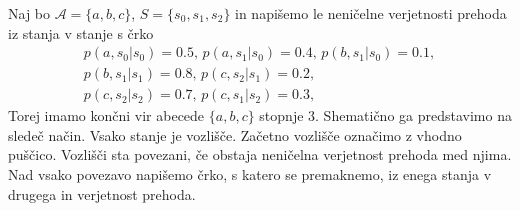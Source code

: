 \documentclass[fin1, tisk]{fmfdelo}
\newcommand{\A}{\mathcal{A}}
\theoremstyle{definition}
\begin{document}
\begin{primer}
    Naj bo $\A = \{ a, b, c \}$, $S = \{ s_0, s_1, s_2 \}$ in napišemo le neničelne 
    verjetnosti prehoda iz stanja v stanje s črko
    \begin{gather*}
        p(a, s_0|s_0) = 0.5, \, p(a, s_1|s_0) = 0.4, \, p(b, s_1|s_0) = 0.1, \\
        p(b, s_1|s_1) = 0.8, \, p(c, s_2|s_1) = 0.2, \\
        p(c, s_2|s_2) = 0.7, \, p(c, s_1|s_2) = 0.3,
    \end{gather*}
    Torej imamo končni vir abecede $\{ a, b, c \}$ stopnje $3$. Shematično ga predstavimo na 
    sledeč način. Vsako stanje je vozlišče. Začetno vozlišče označimo z vhodno puščico. Vozlišči sta 
    povezani, če obstaja neničelna verjetnost prehoda med njima. Nad vsako povezavo napišemo črko,
    s katero se premaknemo, iz enega stanja v drugega in verjetnost prehoda.
    \begin{figure}[H] 
        \centering 
\end{figure}
\end{primer}
\end{document}
